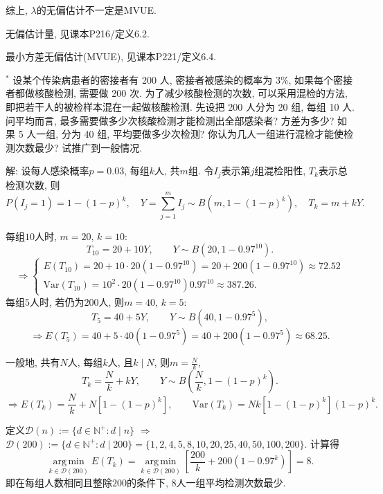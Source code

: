 \documentclass[standard]{ExBook}
\renewenvironment{shaded}{%
  \def\FrameCommand{\fboxsep=\FrameSep \colorbox{shadecolor}}%
  \MakeFramed{\advance\hsize-\width \FrameRestore}%
}{%
  \endMakeFramed
}
\begin{document}
\begin{qitems}
综上, $\lambda$的无偏估计不一定是MVUE.

\textcolor{themeColor}{\selectfont {} 无偏估计量, 见课本P216/定义6.2.}

\textcolor{themeColor}{\selectfont {} 最小方差无偏估计(MVUE), 见课本P221/定义6.4.}

\vspace{2.5cm-5em}

    \begin{bbox}
    \begin{shaded}
        \qitem$^*$
设某个传染病患者的密接者有 200 人, 密接者被感染的概率为 3\%, 如果每个密接者都做核酸检测, 需要做 200 次. 为了减少核酸检测的次数, 可以采用混检的方法, 即把若干人的被检样本混在一起做核酸检测. 先设把 200 人分为 20 组, 每组 10 人. 问平均而言, 最多需要做多少次核酸检测才能检测出全部感染者? 方差为多少? 如果 5 人一组, 分为 40 组, 平均要做多少次检测? 你认为几人一组进行混检才能使检测次数最少? 试推广到一般情况.
    \end{shaded}
    \end{bbox}

\vspace{\dimexpr2.5cm-5em\relax}

解: 设每人感染概率$p=0.03$, 每组$k$人, 共$m$组. 令$I_j$表示第$j$组混检阳性, $T_k$表示总检测次数, 则
$$
P(I_j=1)=1-(1-p)^k,\quad
Y=\sum_{j=1}^{m}I_j\sim B(m,1-(1-p)^k),\quad
T_k=m+kY.
$$

每组$10$人时, $m=20$, $k=10$:
$$
T_{10}=20+10Y,\qquad
Y\sim B(20,1-0.97^{10}).
$$
$$
\Longrightarrow
\left\{
\begin{array}{l}
E(T_{10})
=20+10\cdot20(1-0.97^{10})
=20+200(1-0.97^{10})
\approx72.52\\
\mathrm{Var}(T_{10})
=10^2\cdot20(1-0.97^{10})0.97^{10}
\approx387.26.
\end{array}
\right.
$$
每组$5$人时, 若仍为$200$人, 则$m=40$, $k=5$:
$$
T_5=40+5Y,\qquad
Y\sim B(40,1-0.97^5),
$$
$$
\Longrightarrow
E(T_5)
=
40+5\cdot40(1-0.97^5)
=
40+200(1-0.97^5)
\approx68.25.
$$

一般地, 共有$N$人, 每组$k$人, 且$k\mid N$, 则$m=\frac Nk$,
$$
T_k=\frac Nk+kY,\qquad
Y\sim B\left(\frac Nk,1-(1-p)^k\right).
$$
$$
\Longrightarrow
E(T_k)=\frac Nk+N[1-(1-p)^k],
\qquad
\mathrm{Var}(T_k)=Nk[1-(1-p)^k](1-p)^k.
$$

定义$\mathcal D(n):=\{d\in\mathbb N^+:d\mid n\}$ $\Longrightarrow$ $\mathcal D(200):=\{d\in\mathbb N^+:d\mid200\}
=
\{1,2,4,5,8,10,20,25,40,50,100,200\}$. 计算得
$$
\operatorname*{arg\,min}_{k\in\mathcal D(200)}E(T_k)
=
\operatorname*{arg\,min}_{k\in\mathcal D(200)}
\left[\frac{200}{k}+200(1-0.97^k)\right]
=
8.
$$
即在每组人数相同且整除$200$的条件下, $8$人一组平均检测次数最少.
\end{qitems}
\end{document}
